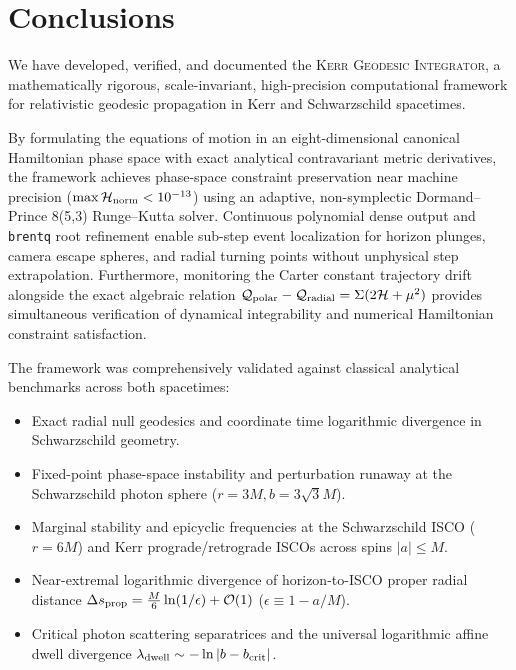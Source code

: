 \section{Conclusions}
\label{sec:conclusions}

We have developed, verified, and documented the \textsc{Kerr Geodesic Integrator}, a mathematically rigorous, scale-invariant, high-precision computational framework for relativistic geodesic propagation in Kerr and Schwarzschild spacetimes.

By formulating the equations of motion in an eight-dimensional canonical Hamiltonian phase space with exact analytical contravariant metric derivatives, the framework achieves phase-space constraint preservation near machine precision ($\max \mathcal{H}_{\rm norm} < 10^{-13}$) using an adaptive, non-symplectic Dormand--Prince 8(5,3) Runge--Kutta solver. Continuous polynomial dense output and \texttt{brentq} root refinement enable sub-step event localization for horizon plunges, camera escape spheres, and radial turning points without unphysical step extrapolation. Furthermore, monitoring the Carter constant trajectory drift alongside the exact algebraic relation $\mathcal{Q}_{\rm polar} - \mathcal{Q}_{\rm radial} = \Sigma(2\mathcal{H} + \mu^2)$ provides simultaneous verification of dynamical integrability and numerical Hamiltonian constraint satisfaction.

The framework was comprehensively validated against classical analytical benchmarks across both spacetimes:
\begin{itemize}
    \item Exact radial null geodesics and coordinate time logarithmic divergence in Schwarzschild geometry.
    \item Fixed-point phase-space instability and perturbation runaway at the Schwarzschild photon sphere ($r = 3M, b = 3\sqrt{3}M$).
    \item Marginal stability and epicyclic frequencies at the Schwarzschild ISCO ($r = 6M$) and Kerr prograde/retrograde ISCOs across spins $|a| \le M$.
    \item Near-extremal logarithmic divergence of horizon-to-ISCO proper radial distance $\Delta s_{\rm prop} = \frac{M}{6}\ln(1/\epsilon) + \mathcal{O}(1)$ ($\epsilon \equiv 1-a/M$).
    \item Critical photon scattering separatrices and the universal logarithmic affine dwell divergence $\lambda_{\rm dwell} \sim -\ln|b - b_{\rm crit}|$.
\end{itemize}

